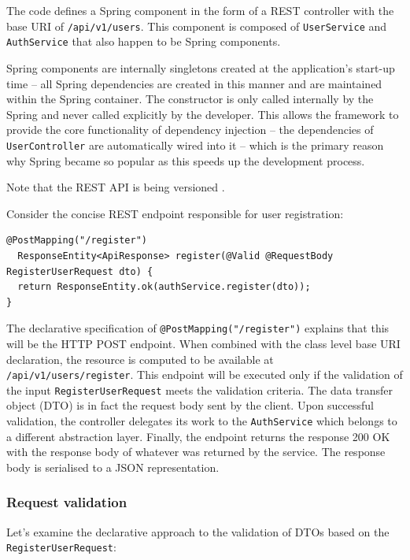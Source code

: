 \documentclass[a4paper,twoside,12pt]{book}
\begin{document}
The code defines a Spring component in the form of a REST controller with the base URI of \verb|/api/v1/users|. This component is composed of \texttt{UserService} and \texttt{AuthService} that also happen to be Spring components.

Spring components are internally singletons \cite{bib:gamma} created at the application's start-up time -- all Spring dependencies are created in this manner and are maintained within the Spring container. The constructor is only called internally by the Spring and never called explicitly by the developer. This allows the framework to provide the core functionality of dependency injection \cite{bib:spring_in_action} -- the dependencies of \texttt{UserController} are automatically wired into it -- which is the primary reason why Spring became so popular as this speeds up the development process.

Note that the REST API is being versioned \cite{bib:modern_fullstack}.

Consider the concise REST endpoint responsible for user registration:
\begin{verbatim}
@PostMapping("/register")
  ResponseEntity<ApiResponse> register(@Valid @RequestBody RegisterUserRequest dto) {
  return ResponseEntity.ok(authService.register(dto));
}
\end{verbatim}

The declarative specification of \texttt{@PostMapping("/register")} explains that this will be the HTTP POST endpoint. When combined with the class level base URI declaration, the resource is computed to be available at %
\verb|/api/v1/users/register|.
%
This endpoint will be executed only if the validation of the input %
\texttt{RegisterUserRequest} meets the validation criteria. The data transfer object (DTO) is in fact the request body sent by the client.
%
Upon successful validation, the controller delegates its work to the \texttt{AuthService} which belongs to a different abstraction layer.
%
Finally, the endpoint returns the response 200 OK \cite{bib:rfc7231} with the response body of whatever was returned by the service. The response body is serialised to a JSON representation.

\subsubsection{Request validation}
Let's examine the declarative approach to the validation of DTOs based on the \texttt{RegisterUserRequest}:
\end{document}
